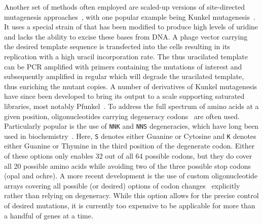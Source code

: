 Another set of methods often employed are scaled-up versions of site-directed mutagenesis approaches~\cite{seyfang_multiple_2004,firnberg_pfunkel:_2012}, with one popular example being Kunkel mutagenesis~\cite{kunkel_rapid_1985}. It uses a special strain of  that has been modified to produce high levels of uridine and lacks the ability to excise these bases from DNA. A phage vector carrying the desired template sequence is transfected into the cells resulting in its replication with a high uracil incorporation rate. The thus uracilated template can be PCR amplified with primers containing the mutations of interest and subsequently amplified in regular  which will degrade the uracilated template, thus enriching the mutant copies. A number of derivatives of Kunkel mutagenesis have since been developed to bring its output to a scale supporting saturated libraries, most notably Pfunkel~\cite{firnberg_pfunkel:_2012}.
To address the full spectrum of amino acids at a given position, oligonucleotides carrying degeneracy codons~\cite{pal_methods_2005} are often used. Particularly popular is the use of \texttt{NNK} and \texttt{NNS} degeneracies, which have long been used in biochemistry~\cite{scott_searching_1990,barbas_semisynthetic_1992}. Here, \texttt{S} denotes either Guanine or Cytosine and \texttt{K} denotes either Guanine or Thymine in the third position of the degenerate codon. Either of these options only enables 32 out of all 64 possible codons, but they do cover all 20 possible amino acids while avoiding two of the three possible stop codons (opal and ochre). A more recent development is the use of custom oligonucleotide arrays covering all possible (or desired) options of codon changes~\cite{kitzman_massively_2015} explicitly rather than relying on degeneracy. While this option allows for the precise control of desired mutations, it is currently too expensive to be applicable for more than a handful of genes at a time.


